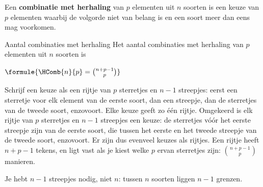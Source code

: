 \begin{theorie}
Een \textbf{\textcolor{accent}{combinatie met herhaling}} van $p$ elementen uit $n$ soorten is een keuze van $p$ elementen waarbij de volgorde niet van belang is en een soort meer dan eens mag voorkomen.

\begin{stelling}{Aantal combinaties met herhaling}
Het aantal combinaties met herhaling van $p$ elementen uit $n$ soorten is

\vspace{1mm}
\qquad $\formule{\HComb{n}{p} = \binom{n + p - 1}{p}}$
\end{stelling}

\begin{bewijs}
Schrijf een keuze als een rijtje van $p$ sterretjes en $n - 1$ streepjes: eerst een sterretje voor elk element van de eerste soort, dan een streepje, dan de sterretjes van de tweede soort, enzovoort. Elke keuze geeft zo één rijtje. Omgekeerd is elk rijtje van $p$ sterretjes en $n - 1$ streepjes een keuze: de sterretjes vóór het eerste streepje zijn van de eerste soort, die tussen het eerste en het tweede streepje van de tweede soort, enzovoort. Er zijn dus evenveel keuzes als rijtjes. Een rijtje heeft $n + p - 1$ tekens, en ligt vast als je kiest welke $p$ ervan sterretjes zijn: $\binom{n + p - 1}{p}$ manieren.
\end{bewijs}
\end{theorie}

Je hebt $n - 1$ streepjes nodig, niet $n$: tussen $n$ soorten liggen $n - 1$ grenzen.



\begin{oefeningen}
\end{oefeningen}

